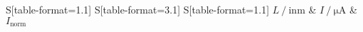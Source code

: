 \begin{table}
    \centering
    \caption{Resonatorlänge und dazu gemessene Intensität bei einem Resonator mit zwei konkaven Spiegeln}
    \label{tab:curv}
    \begin{tabular}{
	S[table-format=1.1]
	S[table-format=3.1]
	S[table-format=1.1]
	}
	\toprule
	{$L \ / \ \mathrm{in} \si{\metre}$}		& {$I \ / \ \si{\micro\ampere}$}		& 
	{$I_\text{norm}$}		\\ 
	\midrule
    
    \bottomrule
    \end{tabular}
    \end{table}
